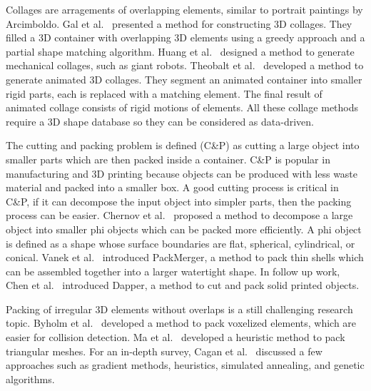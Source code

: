 Collages are arragements of overlapping elements, similar to
portrait paintings by Arcimboldo.
Gal et al.~\cite{Gal2007B} presented a method for constructing 3D
collages.  They filled a 3D container with overlapping 3D elements using a greedy
approach and a partial shape matching algorithm.
Huang et al.~\cite{Huang2014} designed a method
to generate mechanical collages, such as giant robots.
Theobalt et al.~\cite{Theobalt2007}
developed a method to generate animated 3D collages.
They segment an animated container
into smaller rigid parts, each is replaced with a matching element.
The final result of animated collage consists of rigid motions of elements.
All these collage methods require a 3D shape database so they can be considered as data-driven. 

The cutting and packing problem is defined (C\&P) as cutting a large object into smaller parts 
which are then packed inside a container.
C\&P is popular in manufacturing and 3D printing because
objects can be produced with less waste material and packed into a smaller box.
A good cutting process is critical in C\&P, if it can decompose the input object
into simpler parts, then the packing process can be easier.
Chernov et al.~\cite{Chernov2010} proposed a method to decompose a large object
into smaller phi objects which can be packed more efficiently.
A phi object is defined as a shape whose surface boundaries 
are flat, spherical, cylindrical, or conical.
Vanek et al.~\cite{Vanek2014} introduced PackMerger,
a method to pack thin shells which can be assembled together into
a larger watertight shape.
In follow up work, Chen et al.~\cite{Chen2015} introduced Dapper,
a method to cut and pack solid printed objects.

Packing of irregular 3D elements without overlaps 
is a still challenging research topic.
Byholm et al.~\cite{Byholm2009} developed a method
to pack voxelized elements, which are easier for collision detection.
Ma et al.~\cite{Ma2018} developed a heuristic method
to pack triangular meshes.
For an in-depth survey, Cagan et al.~\cite{Cagan2002} discussed a few approaches such as
gradient methods, heuristics, simulated annealing, and genetic algorithms.


